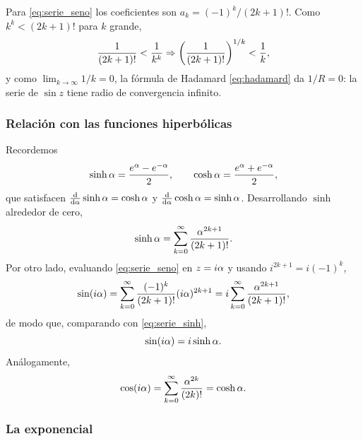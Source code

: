\begin{observacion}
  Para \eqref{eq:serie_seno} los coeficientes son
  $a_k=(-1)^k/(2k+1)!$. Como $k^k<(2k+1)!$ para $k$ grande,
  \begin{equation}
    \label{eq:cota_factorial}
    \frac{1}{(2k+1)!}<\frac{1}{k^k}
    \Rightarrow
    \left( \frac{1}{(2k+1)!} \right)^{1/k}<\frac{1}{k},
  \end{equation}
  y como $\lim_{k\rightarrow\infty}1/k=0$, la f\'ormula de Hadamard
  \eqref{eq:hadamard} da $1/R=0$: la serie de $\sin z$ tiene radio de
  convergencia infinito.
\end{observacion}

\subsubsection{Relaci\'on con las funciones hiperb\'olicas}
\label{subsubsec:hiperbolicas}

Recordemos
\begin{equation}
  \label{eq:hiperbolicas}
  \sinh\alpha=\frac{e^{\alpha}-e^{-\alpha}}{2},
  \qquad
  \cosh\alpha=\frac{e^{\alpha}+e^{-\alpha}}{2},
\end{equation}
que satisfacen $\frac{\mathrm{d}}{\mathrm{d}\alpha}\sinh\alpha=\cosh\alpha$ y
$\frac{\mathrm{d}}{\mathrm{d}\alpha}\cosh\alpha=\sinh\alpha$. Desarrollando $\sinh$ alrededor de cero,
\begin{equation}
  \label{eq:serie_sinh}
  \sinh\alpha=\sum_{k=0}^{\infty}\frac{\alpha^{2k+1}}{(2k+1)!} .
\end{equation}
Por otro lado, evaluando \eqref{eq:serie_seno} en $z=i\alpha$ y usando
$i^{2k+1}=i(-1)^k$,
\begin{equation}
  \label{eq:seno_imaginario}
  \sin(i\alpha)=\sum_{k=0}^{\infty}\frac{(-1)^k}{(2k+1)!}(i\alpha)^{2k+1}
    =i\sum_{k=0}^{\infty}\frac{\alpha^{2k+1}}{(2k+1)!} ,
\end{equation}
de modo que, comparando con \eqref{eq:serie_sinh},
\begin{equation}
  \label{eq:seno_sinh}
  \sin(i\alpha)=i\sinh\alpha .
\end{equation}
An\'alogamente,
\begin{equation}
  \label{eq:coseno_cosh}
  \cos(i\alpha)=\sum_{k=0}^{\infty}\frac{\alpha^{2k}}{(2k)!}=\cosh\alpha .
\end{equation}

\subsubsection{La exponencial}
\label{subsubsec:exponencial}

